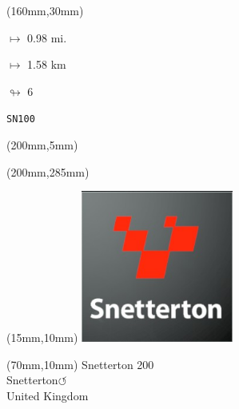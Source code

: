\begin{textblock*}{40mm}(160mm,30mm)%
\Large
\par$\mapsto$ 0.98 mi.
\par$\mapsto$ 1.58 km
\par$\looparrowright$ 6
\par\hfill\tiny\tt SN100\\
\end{textblock*}
\begin{textblock*}{20mm}(200mm,5mm)%
\fbox{\thepage}
\label{SN100}
\end{textblock*}
\begin{textblock*}{20mm}(200mm,285mm)%
\fbox{\thepage}
\end{textblock*}

\null\newpage
\begin{textblock*}{50mm}(15mm,10mm)%
\includegraphics[width=50mm]{LG/2015-05-20_00095.png}
\end{textblock*}
\begin{textblock*}{130mm}(70mm,10mm)%
{\fontsize{20}{20}\selectfont Snetterton 200\\}
{\fontsize{16}{16}\selectfont Snetterton\hfill \huge$\circlearrowleft$\\}
{\fontsize{12}{12}\selectfont United Kingdom\\}
\end{textblock*}
